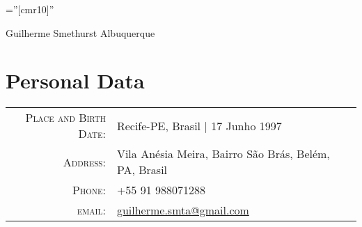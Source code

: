 \documentclass[a4paper,10pt]{article}
\begin{document}
\pagestyle{empty} %

\font\fb=''[cmr10]'' %

\par{\centering
		{\Huge Guilherme Smethurst Albuquerque
	}\bigskip\par}

\section{Personal Data}

\begin{tabular}{rl}
    \textsc{Place and Birth Date:} & Recife-PE, Brasil  | 17 Junho 1997 \\
    \textsc{Address:}   & Vila Anésia Meira, Bairro São Brás, Belém, PA, Brasil \\
    \textsc{Phone:}     & +55 91 988071288\\
    \textsc{email:}     &  \href{mailto:guilherme.smta@gmail.com}{guilherme.smta@gmail.com}
\end{tabular}

\end{document}

